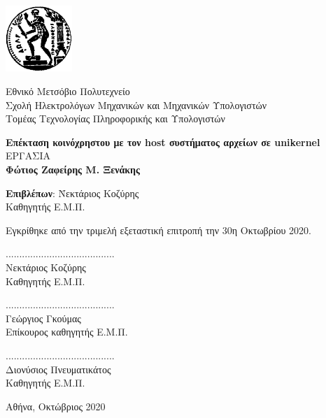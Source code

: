 \documentclass[12pt, a4paper, notitlepage]{report}
\newcommand{\en}[1]{\foreignlanguage{english}{#1}}
\newcommand{\blankpage}{\newpage\null\thispagestyle{empty}\newpage}
\newcommand{\host}{\en{host}}
\begin{document}
\blankpage

\vspace*{-8ex}
\noindent
\begin{minipage}{3.0cm}
	\includegraphics[height=2.5cm]{pyrforos}
\end{minipage}
\begin{minipage}{12.0cm}
	Εθνικό Μετσόβιο Πολυτεχνείο \\[3pt]
	Σχολή Ηλεκτρολόγων Μηχανικών και Μηχανικών Υπολογιστών \\[3pt]
	Τομέας Τεχνολογίας Πληροφορικής και Υπολογιστών
\end{minipage}
\vspace{14ex}
\begin{center}
	\large\textbf{Επέκταση κοινόχρηστου με τον \host{} συστήματος αρχείων σε \en{unikernel}} \\
	\vspace{14ex}
	 ΕΡΓΑΣΙΑ \\
	\vspace{1ex}
	\center\textbf{Φώτιος Ζαφείρης Μ. Ξενάκης}
\end{center}
\vfill
\begin{tabbing}
	\normalsize
	\textbf{Επιβλέπων}: \= Νεκτάριος Κοζύρης \\
						\> Καθηγητής Ε.Μ.Π.
\end{tabbing}
\vspace{4ex}
Εγκρίθηκε από την τριμελή εξεταστική επιτροπή την 30η Οκτωβρίου 2020.
\vspace{4ex}
\begin{center}
	\scriptsize
	\parbox[b]{0.3\textwidth} {
		\center
		........................................ \\
		Νεκτάριος Κοζύρης \\
		Καθηγητής Ε.Μ.Π.
	}
	\parbox[b]{0.3\textwidth} {
		\center
		........................................ \\
		Γεώργιος Γκούμας \\
		Επίκουρος καθηγητής Ε.Μ.Π.
	}
	\parbox[b]{0.3\textwidth} {
		\center
		........................................ \\
		Διονύσιος Πνευματικάτος \\
		Καθηγητής Ε.Μ.Π.
	}
\end{center}
\vspace{2ex}
\begin{center}
	\normalsize
	Αθήνα, Οκτώβριος 2020
\end{center}
\thispagestyle{empty}
\end{document}
